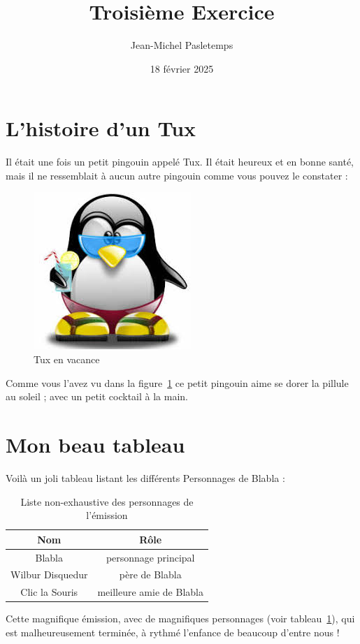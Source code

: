 \documentclass[a4paper, 10pt]{article}
\author{Jean-Michel Pasletemps}
\date {18 février 2025}
\title{Troisième Exercice}
\begin{document}
\tableofcontents
\maketitle

\section{L'histoire d'un Tux}

Il était une fois un petit pingouin appelé Tux.  Il était heureux et en bonne santé, mais il ne ressemblait à aucun autre pingouin comme vous pouvez le constater :

\begin{figure}[!ht]
\centering
\includegraphics[scale=0.7]{tux.jpeg}
\caption{Tux en vacance}
\label{fig:tux}
\end{figure}

Comme vous l'avez vu dans la figure~\ref{fig:tux} ce petit pingouin aime se dorer la pillule au soleil ; avec un petit cocktail à la main. 

\section{Mon beau tableau}

Voilà un joli tableau listant les différents Personnages de Blabla :

\begin{table}[!ht]
\centering
\begin{tabular}{|c||c|}
\hline
Nom & Rôle \\
\hline
\hline
Blabla & personnage principal \\
\hline
Wilbur Disquedur & père de Blabla \\
\hline
Clic la Souris & meilleure amie de Blabla\\
\hline
\end{tabular}
\caption{Liste non-exhaustive des personnages de l'émission}
\label{tab:Blabla}
\end{table}

Cette magnifique émission, avec de magnifiques personnages (voir tableau~\ref{tab:Blabla}), qui est malheureusement terminée, à rythmé l'enfance de beaucoup d'entre nous !
\end{document}
